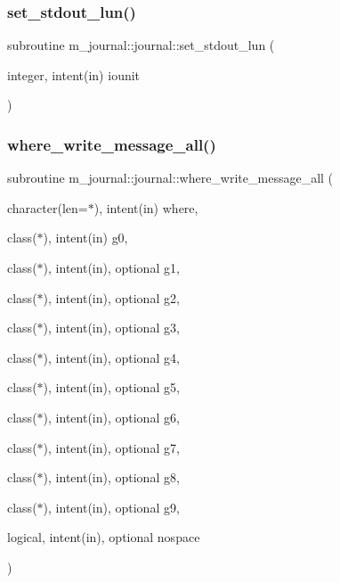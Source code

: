 \mbox{\label{interfacem__journal_1_1journal_a78f9c4a4314847963a2feae798ff54c1}} 
\subsubsection{\texorpdfstring{set\+\_\+stdout\+\_\+lun()}{set\_stdout\_lun()}}
{\footnotesize\ttfamily subroutine m\+\_\+journal\+::journal\+::set\+\_\+stdout\+\_\+lun (\begin{DoxyParamCaption}\item[{integer, intent(in)}]{iounit }\end{DoxyParamCaption})\hspace{0.3cm}{\ttfamily [private]}}

\mbox{\label{interfacem__journal_1_1journal_ae6136e918d4383d1c463c536a3eb814a}} 
\subsubsection{\texorpdfstring{where\+\_\+write\+\_\+message\+\_\+all()}{where\_write\_message\_all()}}
{\footnotesize\ttfamily subroutine m\+\_\+journal\+::journal\+::where\+\_\+write\+\_\+message\+\_\+all (\begin{DoxyParamCaption}\item[{character(len=$\ast$), intent(in)}]{where,  }\item[{class($\ast$), intent(in)}]{g0,  }\item[{class($\ast$), intent(in), optional}]{g1,  }\item[{class($\ast$), intent(in), optional}]{g2,  }\item[{class($\ast$), intent(in), optional}]{g3,  }\item[{class($\ast$), intent(in), optional}]{g4,  }\item[{class($\ast$), intent(in), optional}]{g5,  }\item[{class($\ast$), intent(in), optional}]{g6,  }\item[{class($\ast$), intent(in), optional}]{g7,  }\item[{class($\ast$), intent(in), optional}]{g8,  }\item[{class($\ast$), intent(in), optional}]{g9,  }\item[{logical, intent(in), optional}]{nospace }\end{DoxyParamCaption})\hspace{0.3cm}{\ttfamily [private]}}

